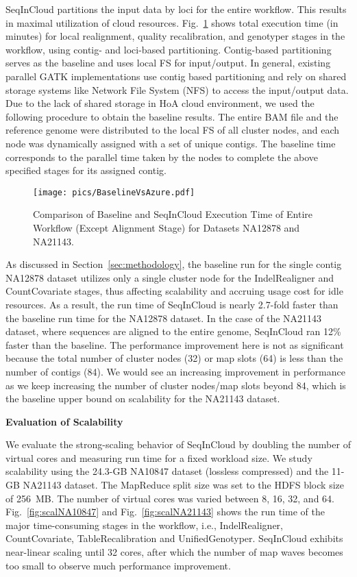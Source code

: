 SeqInCloud partitions the input data by loci for the entire workflow. This results in maximal utilization of cloud resources. Fig.~\ref{fig:baseline} shows total execution time (in minutes) for local realignment, quality recalibration, and genotyper stages in the workflow, using contig- and loci-based partitioning. Contig-based partitioning serves as the baseline and uses local FS for input/output. In general, existing parallel GATK implementations use contig based partitioning and rely on shared storage systems like Network File System (NFS) to access the input/output data. Due to the lack of shared storage in HoA cloud environment, we used the following procedure to obtain the baseline results. The entire BAM file and the reference genome were distributed to the local FS of all cluster nodes, and each node was dynamically assigned with a set of unique contigs. The baseline time corresponds to the parallel time taken by the nodes to complete the above specified stages for its assigned contig. 

\begin{figure}[!htbp]
  \centering
  \texttt{[image: pics/BaselineVsAzure.pdf]}
  \caption{Comparison of Baseline and SeqInCloud Execution Time of Entire Workflow
           (Except Alignment Stage) for Datasets NA12878 and NA21143.}	
  \label{fig:baseline}
\end{figure}

As discussed in Section~\ref{sec:methodology}, the baseline run for the single contig NA12878 dataset utilizes only a single cluster node for the IndelRealigner and CountCovariate stages, thus affecting scalability and accruing usage cost for idle resources.  As a result, the run time of
SeqInCloud is nearly 2.7-fold faster than the baseline run time for the NA12878 dataset. In the case of the NA21143 dataset, where sequences are aligned to the entire genome, SeqInCloud ran 12\% faster than the baseline. The performance improvement here is not as significant because the total number of cluster nodes (32) or map slots (64) is less than the number of contigs (84).  We would
see an increasing improvement in performance as we keep increasing the number of cluster nodes/map slots beyond 84, which is the baseline upper bound on scalability for the NA21143 dataset.

\noindent\textbf{Evaluation of Scalability}

We evaluate the strong-scaling behavior of SeqInCloud by doubling the number of virtual cores and measuring run time for a fixed workload size. We study scalability using the 24.3-GB NA10847 dataset (lossless compressed) and the 11-GB NA21143 dataset. The MapReduce split size was set to the HDFS block size of 256~MB. The number of virtual cores was varied between 8, 16, 32, and 64.  Fig.~\ref{fig:scalNA10847} and Fig.~\ref{fig:scalNA21143} shows the run time of the major time-consuming stages in the workflow, i.e., IndelRealigner, CountCovariate, TableRecalibration and UnifiedGenotyper.  SeqInCloud exhibits near-linear scaling until 32 cores, after which the number of map waves becomes too small to observe much performance improvement.

